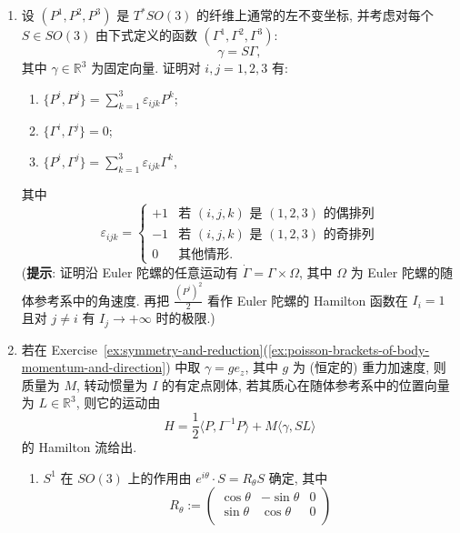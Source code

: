 \begin{RiemannExercise}
\begin{enumerate}[label=(\arabic*),ref=\arabic*,leftmargin=*]
\begin{enumerate}[label=(\alph*),leftmargin=*]
\[
  P=I\Omega,
\]
其中 $P$ 是 $T^*SO(3)$ 上相应的左不变坐标.
\item 写出约化 Poisson 流形 $T^*SO(3)/SO(3)\cong\mathbb{R}^3$ 上的 Hamilton 方程. 辛叶是什么? 举一个非恒定 Casimir 函数的例子.
\item 求 $SO(3)$ 在自身上的左平移作用到 $T^*SO(3)$ 的提升的动量映射.
\end{enumerate}
\item\label{ex:poisson-brackets-of-body-momentum-and-direction}
设 $(P^1,P^2,P^3)$ 是 $T^*SO(3)$ 的纤维上通常的左不变坐标, 并考虑对每个 $S\in SO(3)$ 由下式定义的函数 $(\Gamma^1,\Gamma^2,\Gamma^3)$:
\[
  \gamma=S\Gamma,
\]
其中 $\gamma\in\mathbb{R}^3$ 为固定向量. 证明对 $i,j=1,2,3$ 有:
\begin{enumerate}[label=(\alph*),leftmargin=*]
\item $\{P^i,P^j\}=\sum_{k=1}^3\varepsilon_{ijk}P^k$;
\item $\{\Gamma^i,\Gamma^j\}=0$;
\item $\{P^i,\Gamma^j\}=\sum_{k=1}^3\varepsilon_{ijk}\Gamma^k$,
\end{enumerate}
其中
\[
  \varepsilon_{ijk}=
  \begin{cases}
    +1 & \text{若 $(i,j,k)$ 是 $(1,2,3)$ 的偶排列}\\
    -1 & \text{若 $(i,j,k)$ 是 $(1,2,3)$ 的奇排列}\\
     0 & \text{其他情形}.
  \end{cases}
\]
(\textbf{提示}: 证明沿 Euler 陀螺的任意运动有 $\dot\Gamma=\Gamma\times\Omega$, 其中 $\Omega$ 为 Euler 陀螺的随体参考系中的角速度. 再把 $\frac{(P^i)^2}{2}$ 看作 Euler 陀螺的 Hamilton 函数在 $I_i=1$ 且对 $j\ne i$ 有 $I_j\to+\infty$ 时的极限.)
\item\label{ex:poisson-reduction-of-heavy-rigid-body}
若在 Exercise~\ref{ex:symmetry-and-reduction}(\ref{ex:poisson-brackets-of-body-momentum-and-direction}) 中取 $\gamma=ge_z$, 其中 $g$ 为 (恒定的) 重力加速度, 则质量为 $M$, 转动惯量为 $I$ 的有定点刚体, 若其质心在随体参考系中的位置向量为 $L\in\mathbb{R}^3$, 则它的运动由
\[
  H=\frac{1}{2}\langle P,I^{-1}P\rangle+M\langle\gamma,SL\rangle
\]
的 Hamilton 流给出.
\begin{enumerate}[label=(\alph*),leftmargin=*]
\item $S^1$ 在 $SO(3)$ 上的作用由 $e^{i\theta}\cdot S=R_\theta S$ 确定, 其中
\[
  R_\theta:=\begin{pmatrix}
    \cos\theta & -\sin\theta & 0\\
    \sin\theta & \cos\theta & 0\\

\end{pmatrix}\]
\end{enumerate}
\end{enumerate}
\end{RiemannExercise}
